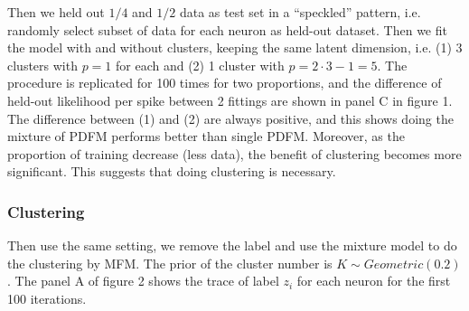 \documentclass{article}
\begin{document}
	Then we held out $1/4$ and $1/2$ data as test set in a “speckled” pattern, i.e. randomly select subset of data for each neuron as held-out dataset. Then we fit the model with and without clusters, keeping the same latent dimension, i.e. (1) 3 clusters with $p=1$ for each and (2) 1 cluster with $p=2\cdot 3 - 1 = 5$. The procedure is replicated for 100 times for two proportions, and the difference of held-out likelihood per spike between 2 fittings are shown in panel C in figure 1. The difference between (1) and (2) are always positive, and this shows doing the mixture of PDFM performs better than single PDFM. Moreover, as the proportion of training decrease (less data), the benefit of clustering becomes more significant. This suggests that doing clustering is necessary.
	
	\subsubsection{Clustering}
	
	Then use the same setting, we remove the label and use the mixture model to do the clustering by MFM. The prior of the cluster number is $K\sim Geometric(0.2)$. The panel A of figure 2 shows the trace of label $z_i$ for each neuron for the first 100 iterations.
	
\end{document}
